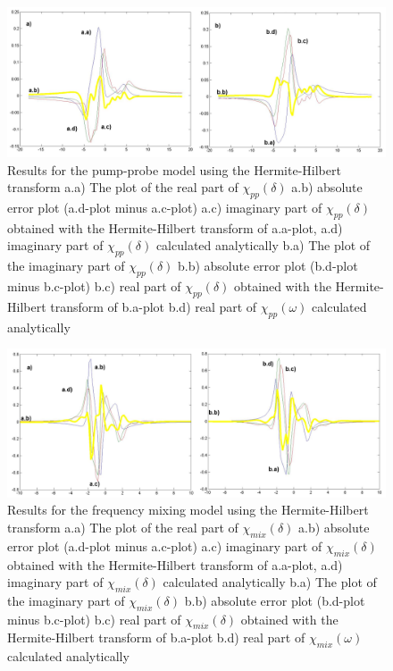 \documentclass[12pt,twoside,a4paper]{article}
\numberwithin{equation}{subsection}
\numberwithin{figure}{subsection}
\begin{document}
\begin{figure} 
  \includegraphics[width=150mm]{img/hht_pnp.png}
  \caption{Results for the pump-probe model using the Hermite-Hilbert transform
     a.a) The plot of the real part of ${\chi_{pp}}(\delta )$
     a.b) absolute error plot (a.d-plot minus a.c-plot)
     a.c) imaginary part of ${\chi_{pp}}(\delta )$ obtained with the Hermite-Hilbert transform of a.a-plot, 
     a.d) imaginary part of ${\chi_{pp}}(\delta )$ calculated analytically 
     b.a) The plot of the imaginary part of ${\chi_{pp}}(\delta )$ 
     b.b) absolute error plot (b.d-plot minus b.c-plot)
     b.c) real part of ${\chi_{pp}}(\delta )$ obtained with the Hermite-Hilbert transform of b.a-plot 
     b.d) real part of $\chi_{pp} (\omega )$ calculated analytically 
     \label{fig:hht_pnp}
     }
\end{figure} 

\begin{figure} 
  \includegraphics[width=150mm]{img/hht_fmix.png}
  \caption{Results for the frequency mixing model using the Hermite-Hilbert transform
     a.a) The plot of the real part of ${\chi_{mix}}(\delta )$
     a.b) absolute error plot (a.d-plot minus a.c-plot)
     a.c) imaginary part of ${\chi_{mix}}(\delta )$ obtained with the Hermite-Hilbert transform of a.a-plot, 
     a.d) imaginary part of ${\chi_{mix}}(\delta )$ calculated analytically 
     b.a) The plot of the imaginary part of ${\chi_{mix}}(\delta )$ 
     b.b) absolute error plot (b.d-plot minus b.c-plot)
     b.c) real part of ${\chi_{mix}}(\delta )$ obtained with the Hermite-Hilbert transform of b.a-plot  
     b.d) real part of $\chi_{mix} (\omega )$ calculated analytically 
     \label{fig:hht_fmix}
     }
\end{figure}
\end{document}
